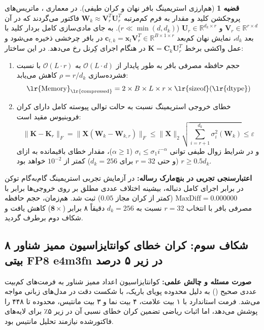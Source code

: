 \documentclass[12pt,a4paper]{report}
\theoremstyle{definition}
\newtheorem{theorem}{قضیه}[chapter]
\begin{document}
\begin{theorem}[هم‌ارزی استریمینگ بافر نهان و کران طیفی]
\label{thm:asvd_streaming_equivalence}
در معماری ، ماتریس‌های پروجکشن کلید و مقدار به فرم کم‌مرتبه $\mathbf{W}_k \approx \mathbf{V}_r^T \mathbf{U}_r^T$ فاکتور می‌گردند که در آن $\mathbf{V}_r \in \mathbb{R}^{r \times d}$ و $\mathbf{U}_r \in \mathbb{R}^{d_k \times r}$ ($r \ll \min(d, d_k)$). به جای مادی‌سازی کامل بردار کلید با بعد $d_k$، نمایش نهان کم‌بعد $\mathbf{c}_{t, k} = \mathbf{x}_t \mathbf{V}_r^T \in \mathbb{R}^{B \times 1 \times r}$ در بافر چرخشی  ذخیره می‌شود و عمل واکشی برخط $\mathbf{K} = \mathbf{C}_k \mathbf{U}_r^T$ در هنگام اجرای کِرنل رخ می‌دهد. در این ساختار:
\begin{enumerate}
    \item حجم حافظه مصرفی بافر  به طور پایدار از $\mathcal{O}(L \cdot d)$ به $\mathcal{O}(L \cdot r)$ با نسبت فشرده‌سازی $\rho = r/d_k$ کاهش می‌یابد:
    \begin{equation}
    \text{\lr{Memory}}_{\text{\lr{compressed}}} = 2 \times B \times L \times r \times \text{\lr{sizeof}}(\text{\lr{dtype}})
    \end{equation}
    \item خطای خروجی استریمینگ نسبت به حالت توالی پیوسته کامل دارای کران فروبنیوس مقید است:
    \begin{equation}
    \|\mathbf{K} - \mathbf{K}_r\|_F = \|\mathbf{X}(\mathbf{W}_k - \mathbf{W}_{k, r})\|_F \le \|\mathbf{X}\|_2 \sqrt{\sum_{i=r+1}^{d_k} \sigma_i^2(\mathbf{W}_k)} \le \varepsilon
    \end{equation}
    و در شرایط زوال طیفی توانی $\sigma_i \le \sigma_1 i^{-\alpha}$ ($\alpha \ge 1$)، مقدار خطای باقیمانده به ازای $r \ge 0.5 d_k$ (و حتی $r=32$ برای $d_k=256$) کمتر از $10^{-2}$ خواهد بود.
\end{enumerate}
\end{theorem}

\textbf{اعتبارسنجی تجربی در بنچ‌مارک رساله:} در آزمایش تجربی استریمینگ گام‌به‌گام توکن در برابر اجرای کامل دنباله، بیشینه اختلاف عددی مطلق بر روی خروجی‌ها برابر با $\text{MaxDiff} = 0.000000$ (کمتر از کران مجاز $0.05$) ثبت شد. هم‌زمان، حجم حافظه مصرفی بافر با انتخاب $r=32$ نسبت به $d_k=256$ دقیقاً ۸ برابر ($\mathbf{8\times}$) کاهش یافت و شکاف دوم برطرف گردید.

\subsection{شکاف سوم: کران خطای کوانتایزاسیون ممیز شناور ۸ بیتی FP8 e4m3fn در زیر ۵ درصد}
\label{subsec:gap3_fp8_bounding}
\textbf{صورت مسئله و چالش علمی:} کوانتایزاسیون اعداد ممیز شناور به فرمت‌های کم‌بیت عددی صحیح () به دلیل محدوده پویای باریک، با شکست دقت در مدل‌های زبانی مواجه می‌شد. فرمت استاندارد  با ۱ بیت علامت، ۴ بیت نما و ۳ بیت مانتیس، محدوده تا ۴۴۸ را پوشش می‌دهد، اما اثبات ریاضی تضمین کران خطای نسبی آن در زیر ۵٪ برای لایه‌های فاکتورشده نیازمند تحلیل مانتیس بود.
\end{document}
